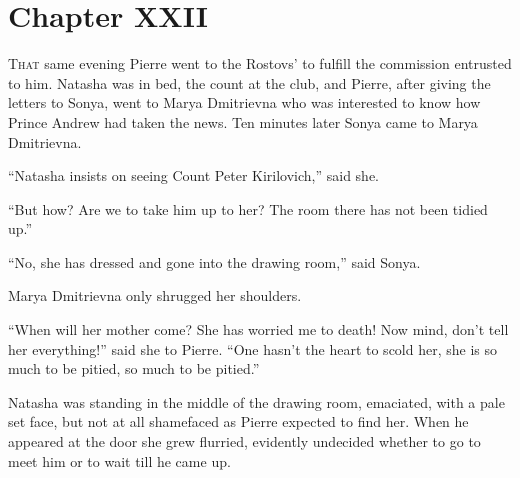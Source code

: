 
\chapter*{Chapter XXII}
\ifaudio     
{} 
\fi

\lettrine[lines=2, loversize=0.3, lraise=0]{\initfamily T}{hat}
same evening Pierre went to the Rostovs' to fulfill the
commission entrusted to him. Natasha was in bed, the count at the
club, and Pierre, after giving the letters to Sonya, went to
Marya Dmitrievna who was interested to know how Prince Andrew had
taken the news. Ten minutes later Sonya came to Marya Dmitrievna.

``Natasha insists on seeing Count Peter Kirilovich,'' said she.

``But how? Are we to take him up to her? The room there has not
been tidied up.''

``No, she has dressed and gone into the drawing room,'' said
Sonya.

Marya Dmitrievna only shrugged her shoulders.

``When will her mother come? She has worried me to death! Now
mind, don't tell her everything!'' said she to Pierre. ``One
hasn't the heart to scold her, she is so much to be pitied, so
much to be pitied.''

Natasha was standing in the middle of the drawing room,
emaciated, with a pale set face, but not at all shamefaced as
Pierre expected to find her. When he appeared at the door she
grew flurried, evidently undecided whether to go to meet him or
to wait till he came up.

